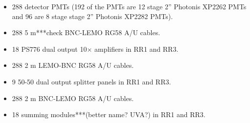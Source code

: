 \documentclass[oneside]{book}   %
\begin{document}
\begin{itemize}\itemsep6pt \parskip0pt 
	\item 288 detector PMTs (192 of the PMTs are 12 stage 2'' Photonis XP2262 PMTs and 96 are 8 stage stage 2'' Photonis XP2282 PMTs).
	\item 288 5 m***check BNC-LEMO RG58 A/U cables. 
	\item 18 PS776 dual output 10$\times$ amplifiers in RR1 and RR3.
	\item 288 2 m LEMO-BNC RG58 A/U cables. 
	\item 9 50-50 dual output splitter panels in RR1 and RR3. 
	\item 288 2 m BNC-LEMO RG58 A/U cables.
	\item 18 summing modules***(better name? UVA?) in RR1 and RR3.
\end{itemize}
\end{document}
